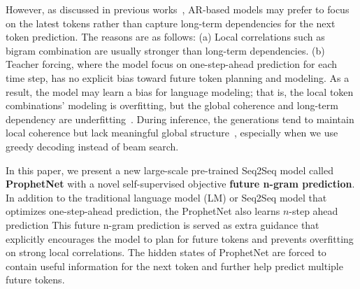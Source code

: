 \documentclass[11pt,a4paper]{article}
\begin{document}
However, as discussed in previous works~\cite{pascanu2013difficulty,gulcehre2017plan,serdyuk2017twin}, AR-based models may prefer to focus on the latest tokens rather than capture long-term dependencies for the next token prediction. The reasons are as follows: (a) Local correlations such as bigram combination are usually stronger than long-term dependencies.
(b) Teacher forcing, where the model focus on one-step-ahead prediction for each time step, has no explicit bias toward future token planning and modeling. As a result, the model may learn a bias for language modeling; that is, the local token combinations' modeling is overfitting, but the global coherence and long-term dependency are underfitting~\cite{krueger2016zoneout,merity2017regularizing,serdyuk2017twin}.
During inference, the generations tend to maintain local coherence but lack meaningful global structure~\cite{li2017learning, serdyuk2017twin}, especially when we use greedy decoding instead of beam search.


In this paper, we present a new large-scale pre-trained Seq2Seq model called \textbf{ProphetNet} with a novel self-supervised objective \textbf{future n-gram prediction}.
In addition to the traditional language model (LM) or Seq2Seq model that optimizes one-step-ahead prediction, the ProphetNet also learns $n$-step ahead prediction%
This future n-gram prediction is served as extra guidance that explicitly encourages the model to plan for future tokens and prevents overfitting on strong local correlations.
The hidden states of ProphetNet are forced to contain useful information for the next token and further help predict multiple future tokens.
\end{document}
